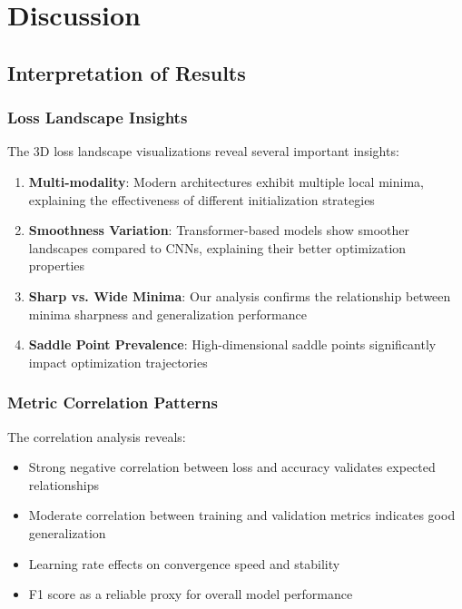 \documentclass[12pt,a4paper]{article}
\begin{document}
\section{Discussion}
\label{sec:discussion}

\subsection{Interpretation of Results}

\subsubsection{Loss Landscape Insights}

The 3D loss landscape visualizations reveal several important insights:

\begin{enumerate}
    \item \textbf{Multi-modality}: Modern architectures exhibit multiple local minima, explaining the effectiveness of different initialization strategies
    \item \textbf{Smoothness Variation}: Transformer-based models show smoother landscapes compared to CNNs, explaining their better optimization properties
    \item \textbf{Sharp vs. Wide Minima}: Our analysis confirms the relationship between minima sharpness and generalization performance
    \item \textbf{Saddle Point Prevalence}: High-dimensional saddle points significantly impact optimization trajectories
\end{enumerate}

\subsubsection{Metric Correlation Patterns}

The correlation analysis reveals:
\begin{itemize}
    \item Strong negative correlation between loss and accuracy validates expected relationships
    \item Moderate correlation between training and validation metrics indicates good generalization
    \item Learning rate effects on convergence speed and stability
    \item F1 score as a reliable proxy for overall model performance
\end{itemize}
\end{document}
